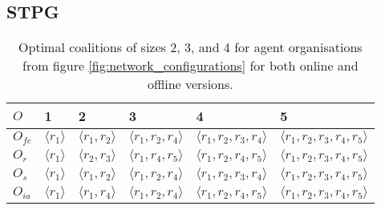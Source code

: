 \documentclass{llncs}
\newcommand{\LD}{\langle}
\newcommand{\RD}{\rangle}
\begin{document}
\clearpage

\subsection{STPG}

\begin{table}
 \centering
 \begin{tabular}{ | l | l | l | l | l | l |}
    \hline
    $O$ & 1& 2 & 3 & 4 & 5 \\ \hline
    $O_{fc}$ & $\LD r_1 \RD$ & $\LD r_1, r_2 \RD$ & $\LD r_1, r_2, r_4 \RD$ & $\LD r_1, r_2, r_3, r_4 \RD$  & $\LD r_1, r_2, r_3, r_4, r_5 \RD$ \\ \hline
    $O_r$ & $\LD r_1 \RD$  & $\LD r_2, r_3 \RD$ & $\LD r_1, r_4, r_5 \RD$ & $\LD r_1, r_2, r_4, r_5 \RD$  & $\LD r_1, r_2, r_3, r_4, r_5 \RD$\\ \hline
    $O_s$ & $\LD r_1 \RD$  & $\LD r_1, r_2 \RD$ & $\LD r_1, r_2, r_4 \RD$ & $\LD r_1, r_2, r_3, r_4 \RD$  & $\LD r_1, r_2, r_3, r_4, r_5 \RD$\\ \hline
    $O_{ia}$ & $\LD r_1 \RD$  & $\LD r_1, r_4 \RD$ & $\LD r_1, r_2, r_4 \RD$ & $\LD r_1, r_2, r_4, r_5 \RD$  & $\LD r_1, r_2, r_3, r_4, r_5 \RD$\\ \hline
\end{tabular}
\caption{Optimal coalitions of sizes 2, 3, and 4 for agent organisations from figure \ref{fig:network_configurations} for both online and offline versions.}
\label{tab:optimal_coalitions}
\end{table}

\begin{table}
 \centering
{}
\caption{Values for maximum probabilities to complete one task for coalitions from table \ref{tab:optimal_coalitions}.}
\end{table}
\end{document}
